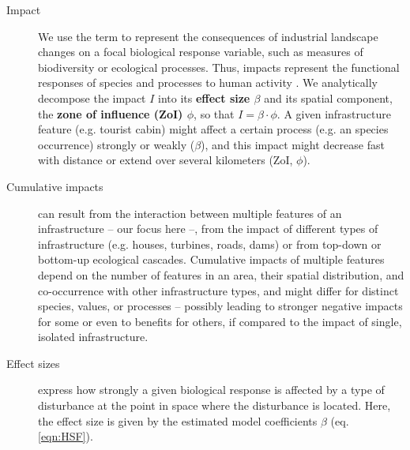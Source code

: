 \documentclass[titlepage]{article}
\begin{document}
\begin{tcolorbox}[width=1.3\textwidth,center,colback=yellow!5,colframe=yellow!75!black,title={Box 1 -- Definitions}]

\begin{description}

    \item[Impact] We use the term to represent the consequences of industrial landscape changes on a focal biological response variable, such as measures of biodiversity or ecological processes. Thus, impacts represent the functional responses of species and processes to human activity \citep{naugle_unifying_2011}. We analytically decompose the impact $I$ into its \textbf{effect size $\beta$} and its spatial component, the \textbf{zone of influence (ZoI) $\phi$}, so that $I = \beta \cdot \phi$. A given infrastructure feature (e.g. tourist cabin) might affect a certain process (e.g. an species occurrence) strongly or weakly ($\beta$), and this impact might decrease fast with distance or extend over several kilometers (ZoI, $\phi$).
    
    \item[Cumulative impacts] can result from the interaction between multiple features of an infrastructure -- our focus here --, from the impact of different types of infrastructure (e.g. houses, turbines, roads, dams) or from top-down or bottom-up ecological cascades. Cumulative impacts of multiple features depend on the number of features in an area, their spatial distribution, and co-occurrence with other infrastructure types, and might differ for distinct species, values, or processes -- possibly leading to stronger negative impacts for some or even to benefits for others, if compared to the impact of single, isolated infrastructure.
    
    \item[Effect sizes] express how strongly a given biological response is affected by a type of disturbance at the point in space where the disturbance is located. Here, the effect size is given by the estimated model coefficients $\beta$ (eq. \ref{eqn:HSF}).
    

\end{description}
\end{tcolorbox}
\end{document}
